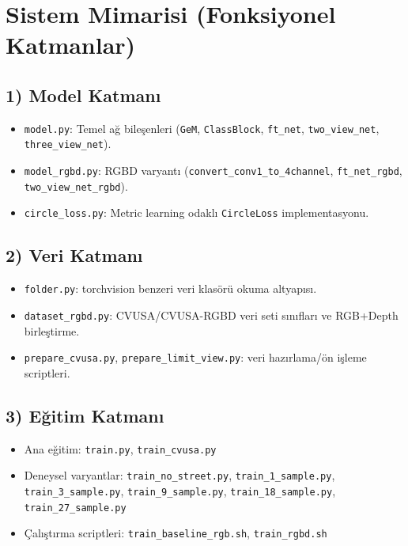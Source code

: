 \documentclass[11pt,a4paper]{article}
\begin{document}
\section{Sistem Mimarisi (Fonksiyonel Katmanlar)}
\subsection{1) Model Katmanı}
\begin{itemize}
    \item \texttt{model.py}: Temel ağ bileşenleri (\texttt{GeM}, \texttt{ClassBlock}, \texttt{ft\_net}, \texttt{two\_view\_net}, \texttt{three\_view\_net}).
    \item \texttt{model\_rgbd.py}: RGBD varyantı (\texttt{convert\_conv1\_to\_4channel}, \texttt{ft\_net\_rgbd}, \texttt{two\_view\_net\_rgbd}).
    \item \texttt{circle\_loss.py}: Metric learning odaklı \texttt{CircleLoss} implementasyonu.
\end{itemize}

\subsection{2) Veri Katmanı}
\begin{itemize}
    \item \texttt{folder.py}: torchvision benzeri veri klasörü okuma altyapısı.
    \item \texttt{dataset\_rgbd.py}: CVUSA/CVUSA-RGBD veri seti sınıfları ve RGB+Depth birleştirme.
    \item \texttt{prepare\_cvusa.py}, \texttt{prepare\_limit\_view.py}: veri hazırlama/ön işleme scriptleri.
\end{itemize}

\subsection{3) Eğitim Katmanı}
\begin{itemize}
    \item Ana eğitim: \texttt{train.py}, \texttt{train\_cvusa.py}
    \item Deneysel varyantlar: \texttt{train\_no\_street.py}, \texttt{train\_1\_sample.py}, \texttt{train\_3\_sample.py}, \texttt{train\_9\_sample.py}, \texttt{train\_18\_sample.py}, \texttt{train\_27\_sample.py}
    \item Çalıştırma scriptleri: \texttt{train\_baseline\_rgb.sh}, \texttt{train\_rgbd.sh}
\end{itemize}
\end{document}
